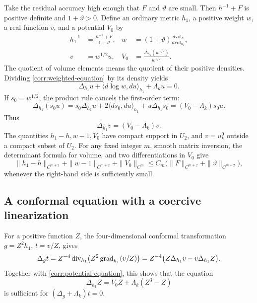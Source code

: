 Take the residual accuracy high enough that \(F\) and \(\vartheta\)
are small.  Then \(h^{-1}+F\) is positive definite and
\(1+\vartheta>0\).  Define an ordinary metric \(h_1\), a positive
weight \(w\), a real function \(v\), and a potential \(V_0\) by
\begin{equation}\label{corr:conjugation-data}
 \begin{aligned}
 h_1^{-1}&=\frac{h^{-1}+F}{1+\vartheta},&
 w&=(1+\vartheta)\frac{d\mathrm{vol}_h}{d\mathrm{vol}_{h_1}},\\
 v&=w^{1/2}u,&
 V_0&=\frac{\Delta_{h_1}(w^{1/2})}{w^{1/2}}.
 \end{aligned}
\end{equation}
The quotient of volume elements means the quotient of their positive
densities.  Dividing \eqref{corr:weighted-equation} by its density
yields
\[
 \Delta_{h_1}u+\langle d\log w,du\rangle_{h_1}
                    +\Lambda_ku=0.
\]
If \(s_0=w^{1/2}\), the product rule cancels the first-order term:
\[
 \Delta_{h_1}(s_0u)
   =s_0\Delta_{h_1}u+2\langle ds_0,du\rangle_{h_1}
                         +u\Delta_{h_1}s_0
   =(V_0-\Lambda_k)s_0u.
\]
Thus
\begin{equation}\label{corr:potential-equation}
 \Delta_{h_1}v=(V_0-\Lambda_k)v.
\end{equation}
The quantities \(h_1-h,w-1,V_0\) have compact support in \(U_2\),
and \(v=u_k^0\) outside a compact subset of \(U_2\).
For any fixed integer \(m\), smooth matrix inversion, the determinant
formula for volume, and two differentiations in \(V_0\) give
\begin{equation}\label{corr:potential-estimate}
 \|h_1-h\|_{C^{m+2}}+\|w-1\|_{C^{m+2}}+\|V_0\|_{C^m}
 \le C_m\bigl(\|F\|_{C^{m+2}}+
                         \|\vartheta\|_{C^{m+2}}\bigr),
\end{equation}
whenever the right-hand side is sufficiently small.

\subsection{A conformal equation with a coercive linearization}

For a positive function \(Z\), the four-dimensional conformal
transformation \(g=Z^2h_1\), \(t=v/Z\), gives
\begin{equation}\label{corr:conformal-identity}
 \Delta_gt
   =Z^{-4}\operatorname{div}_{h_1}\bigl(Z^2\operatorname{grad}_{h_1}(v/Z)\bigr)
   =Z^{-4}\bigl(Z\Delta_{h_1}v-v\Delta_{h_1}Z\bigr).
\end{equation}
Together with \eqref{corr:potential-equation}, this shows that the
equation
\begin{equation}\label{corr:Z-equation}
 \Delta_{h_1}Z=V_0Z+\Lambda_k(Z^3-Z)
\end{equation}
is sufficient for \((\Delta_g+\Lambda_k)t=0\).

